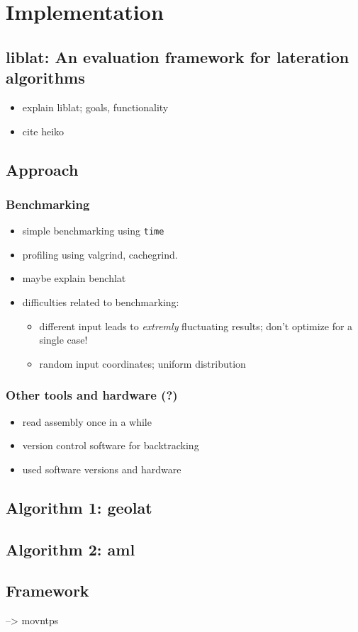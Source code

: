 \section{Implementation}
\label{Implementation}
\subsection{liblat: An evaluation framework for lateration algorithms}
\begin{itemize}
\item explain liblat; goals, functionality
\item cite heiko
\end{itemize}
\subsection{Approach}
\subsubsection{Benchmarking}
\begin{itemize}
\item simple benchmarking using \texttt{time}
\item profiling using valgrind, cachegrind.
\item maybe explain benchlat
\item difficulties related to benchmarking:
\begin{itemize}
\item different input leads to \emph{extremly} fluctuating results; don't optimize for a single case!
\item random input coordinates; uniform distribution
\end{itemize}
\end{itemize}
\subsubsection{Other tools and hardware (?)}
\begin{itemize}
\item read assembly once in a while 
\item version control software for backtracking
\item used software versions and hardware
\end{itemize}
\subsection{Algorithm 1: geolat}
\subsection{Algorithm 2: aml}
\subsection{Framework}
--> movntps